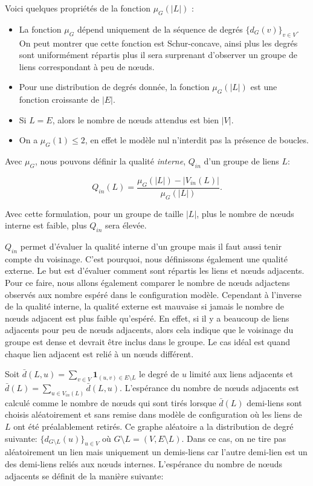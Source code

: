 Voici quelques propriétés de la fonction $\mu_{G}(|L|)$ :
\begin{itemize}
\item La fonction $\mu_{G}$ dépend uniquement de la séquence de degrés $\{d_G(v)\}_{v \in V}$. %
On peut montrer que cette fonction est Schur-concave, ainsi plus les degrés sont uniformément répartis plus il sera surprenant d'observer un groupe de liens correspondant à peu de n\oe uds.
\item Pour une distribution de degrés donnée, la fonction   $\mu_{G}(|L|)$ est une fonction croissante de $|E|$.
\item Si $L=E$, alors le nombre de n\oe uds attendus est bien $|V|$.
\item On a $\mu_{G}(1)\leq 2$, en effet le modèle nul n'interdit pas la présence de boucles.
\end{itemize}

Avec $\mu_G$, nous pouvons définir la qualité \emph{interne}, $Q_{in}$ d'un groupe de liens $L$:
  
\begin{equation}
\label{eq:qin} Q_{in}(L) = \dfrac{\mu_{G}(|L|) - |V_{in}(L)|}{\mu_{G}(|L|)}.
\end{equation}

Avec cette formulation, pour un groupe de taille $|L|$, plus le nombre de n\oe uds interne est faible, plus $Q_{in}$ sera élevée.

$Q_{in}$ permet d'évaluer la qualité interne d'un groupe mais il faut aussi tenir compte du voisinage.
C'est pourquoi, nous définissons également une qualité externe.
Le but est d'évaluer comment sont répartis les liens et n\oe uds adjacents.
Pour ce faire, nous allons également comparer le nombre de n\oe uds adjactens observés aux nombre espéré dans le configuration modèle.
Cependant à l'inverse de la qualité interne, la qualité externe est mauvaise si jamais le nombre de n\oe uds adjacent est plus faible qu'espéré.
En effet, si il y a beaucoup de liens adjacents pour peu de n\oe uds adjacents, alors cela indique que le voisinage du groupe est dense et devrait être inclus dans le groupe.
Le cas idéal est quand chaque lien adjacent est relié à un n\oe uds différent.

Soit $\bar{d}(L,u) = \sum_{v \in V} \mathbf{1}_{(u,v) \in E \setminus L}$ le degré de $u$ limité aux liens adjacents et $\bar{d}(L)=\sum_{u \in V_{in}(L)} \bar{d}(L,u)$.
L'espérance du nombre de n\oe uds adjacents est calculé comme le nombre de n\oe uds qui sont tirés lorsque $\bar{d}(L)$ demi-liens sont choisis aléatoirement et sans remise dans modèle de configuration où les liens de $L$ ont été préalablement retirés.
Ce graphe aléatoire a la distribution de degré suivante: $\{d_{G \setminus L }(u)\}_{u \in V}$ où $G \setminus L = (V,E\setminus L)$.
Dans ce cas, on ne tire pas aléatoirement un lien mais uniquement un demis-liens car l'autre demi-lien est un des demi-liens reliés aux n\oe uds internes.
L'espérance du nombre de n\oe uds adjacents se définit de la manière suivante:

